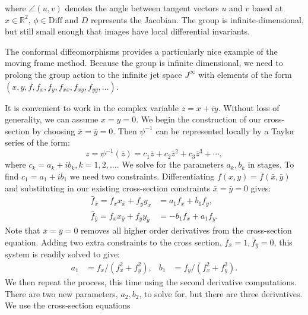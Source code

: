 \documentclass{artjlt}
\begin{document}
\noindent where $\angle(u, v)$ denotes the angle between tangent vectors
$u$ and $v$ based at $x \in \mathbb{R}^2$, $\phi \in \textrm{Diff}$ and $D$
represents the Jacobian. The group is infinite-dimensional, but still small
enough that images have local differential invariants. 

The conformal diffeomorphisms provides a particularly nice example of the
moving frame method. Because the group is infinite dimensional, we need to
prolong the group action to the infinite jet space $J^{\infty}$ with
elements of the form $(x, y, f, f_x, f_y, f_{xx}, f_{xy}, f_{yy}, \ldots)$.

It is convenient to work in the complex variable $z = x + iy$. Without loss of
generality, we can assume $x = y = 0$. We begin the construction of our
cross-section by choosing $\bar{x} = \bar{y} = 0$. Then $\psi^{-1}$ 
can be represented locally by a Taylor series of the form:
\begin{equation*}
    z = \psi^{-1}(\bar{z}) = c_1 \bar{z} + c_2 \bar{z}^2 + c_3\bar{z}^3 + \cdots,
\end{equation*}
where $c_k = a_k + ib_k, k = 1, 2, \ldots$. We solve for the parameters
$a_k, b_k$ in stages.  To find $c_1 = a_1 + i b_1$ we need two constraints.
Differentiating $f(x, y) = \bar{f}(\bar{x}, \bar{y})$ and substituting in
our existing cross-section constraints $\bar{x} = \bar{y} = 0$ gives:
\begin{align*}
    \bar{f}_{\bar{x}} = f_x x_{\bar{x}} + f_y y_{\bar{x}} &= a_1 f_x + b_1
    f_y, \\
    \bar{f}_{\bar{y}} = f_x x_{\bar{y}} + f_y y_{\bar{y}} &= -b_1 f_x + a_1
    f_y. 
\end{align*}
Note that $\bar{x} = \bar{y} = 0$ removes all higher order derivatives from
the cross-section equation. Adding two extra constraints to the cross
section, $\bar{f}_{\bar{x}} = 1, \bar{f}_{\bar{y}} = 0$, this system is readily
solved to give:
\begin{equation*}
    \begin{aligned}
        a_1 &= f_x / (f_x^2 + f_y^2), &  b_1 &= f_y / (f_x^2 + f_y^2).
    \end{aligned}
\end{equation*}
We then repeat the process, this time using the second derivative
computations. There are two new parameters, $a_2, b_2$, to solve
for, but there are three derivatives. We use the cross-section equations
\end{document}
